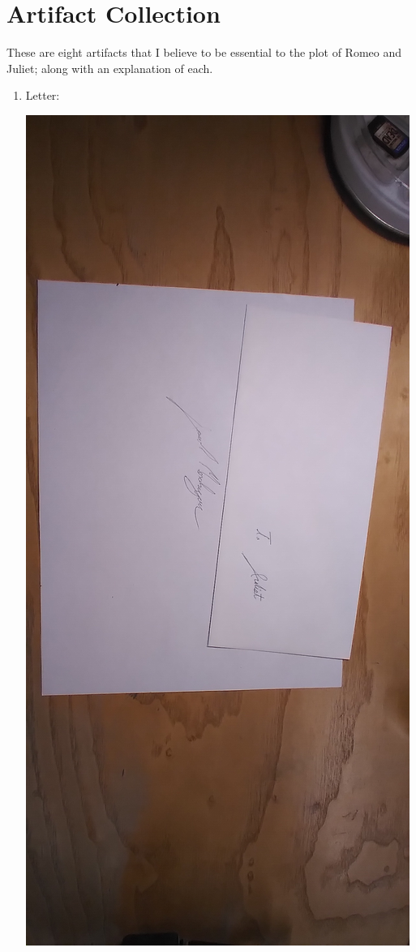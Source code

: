 \documentclass{article}
\begin{document}
\section{Artifact Collection}
These are eight artifacts that I believe to be essential to the plot of Romeo and Juliet; along with an explanation of each.
\begin{enumerate}
    \item{Letter:}
        \begin{center}
            \includegraphics[max width=\textwidth - 6ex]{pics/letter_to_juliet.jpg}
        \end{center}

\end{enumerate}
\end{document}
